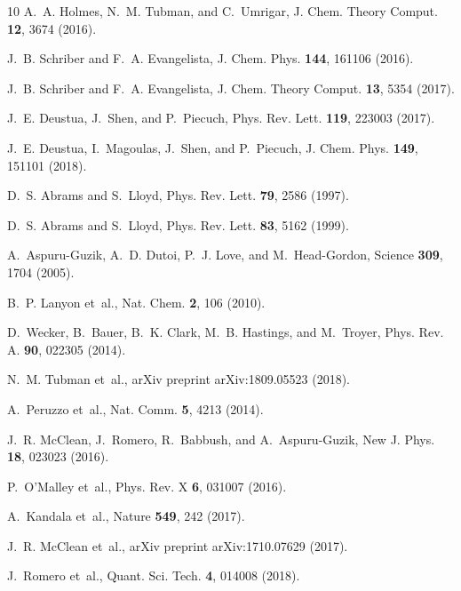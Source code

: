 \documentclass[aps,prl,twocolumn,showpacs,superscriptaddress,groupedaddress]{revtex4}  %
\begin{document}
\begin{thebibliography}{10}
A.~A. Holmes, N.~M. Tubman, and C.~Umrigar,
\newblock J. Chem. Theory Comput. {\bf 12}, 3674 (2016).

J.~B. Schriber and F.~A. Evangelista,
\newblock J. Chem. Phys. {\bf 144}, 161106 (2016).

J.~B. Schriber and F.~A. Evangelista,
\newblock J. Chem. Theory Comput. {\bf 13}, 5354 (2017).

J.~E. Deustua, J.~Shen, and P.~Piecuch,
\newblock Phys. Rev. Lett. {\bf 119}, 223003 (2017).

J.~E. Deustua, I.~Magoulas, J.~Shen, and P.~Piecuch,
\newblock J. Chem. Phys. {\bf 149}, 151101 (2018).

D.~S. Abrams and S.~Lloyd,
\newblock Phys. Rev. Lett. {\bf 79}, 2586 (1997).

D.~S. Abrams and S.~Lloyd,
\newblock Phys. Rev. Lett. {\bf 83}, 5162 (1999).

A.~Aspuru-Guzik, A.~D. Dutoi, P.~J. Love, and M.~Head-Gordon,
\newblock Science {\bf 309}, 1704 (2005).

B.~P. Lanyon et~al.,
\newblock Nat. Chem. {\bf 2}, 106 (2010).

D.~Wecker, B.~Bauer, B.~K. Clark, M.~B. Hastings, and M.~Troyer,
\newblock Phys. Rev. A. {\bf 90}, 022305 (2014).

N.~M. Tubman et~al.,
\newblock arXiv preprint arXiv:1809.05523  (2018).

A.~Peruzzo et~al.,
\newblock Nat. Comm. {\bf 5}, 4213 (2014).

J.~R. McClean, J.~Romero, R.~Babbush, and A.~Aspuru-Guzik,
\newblock New J. Phys. {\bf 18}, 023023 (2016).

P.~O’Malley et~al.,
\newblock Phys. Rev. X {\bf 6}, 031007 (2016).

A.~Kandala et~al.,
\newblock Nature {\bf 549}, 242 (2017).

J.~R. McClean et~al.,
\newblock arXiv preprint arXiv:1710.07629  (2017).

J.~Romero et~al.,
\newblock Quant. Sci. Tech. {\bf 4}, 014008 (2018).


\end{thebibliography}
\end{document}
